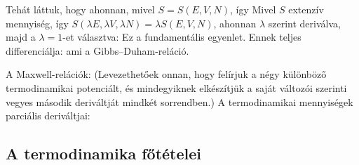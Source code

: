    Tehát láttuk, hogy
   ahonnan, mivel $S=S(E,V,N)$,
   így
   Mivel $S$ extenzív mennyiség, így $S(\lambda E,\lambda V,\lambda N)=\lambda S(E,V,N)$, ahonnan $\lambda$ szerint deriválva, majd a $\lambda=1$-et választva:
   Ez a fundamentális egyenlet.
   Ennek teljes differenciálja: 
   ami a Gibbs--Duham-reláció. 
   
   A Maxwell-relációk: (Levezethetőek onnan, hogy felírjuk a négy különböző termodinamikai potenciált, és mindegyiknek elkészítjük a saját változói szerinti vegyes második deriváltját mindkét sorrendben.)
   A termodinamikai mennyiségek parciális deriváltjai:
   
  \subsection{A termodinamika főtételei}
   
